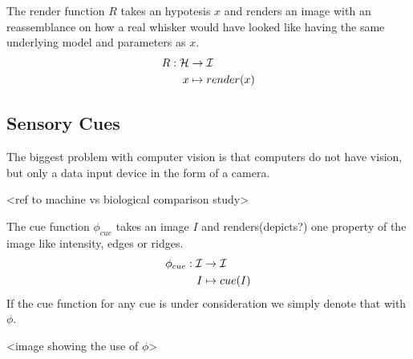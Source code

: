 %
%

%
%

%
%

\begin{definition}
    The render function $R$ takes an hypotesis $x$ and renders an image with an
    reassemblance on how a real whisker would have looked like having the same
    underlying model and parameters as $x$.
    \begin{equation}
        \begin{split}
            R : \mathcal{H} &\rightarrow \mathcal{I}\\
                x &\mapsto render(x)
        \end{split}
    \end{equation}
\end{definition}


\subsection{Sensory Cues}

The biggest problem with computer vision is that computers do not have
vision, but only a data input device in the form of a camera. 

<ref to machine vs biological comparison study>


\begin{definition}
    The cue function $\phi_{cue}$ takes an image $I$ and renders(depicts?) one property of the
    image like intensity, edges or ridges.
    \begin{equation}
        \begin{split}
            \phi_{cue} : \mathcal{I} &\rightarrow \mathcal{I}\\
                I &\mapsto cue(I)
        \end{split}
    \end{equation}
    If the cue function for any cue is under consideration we simply denote that with $\phi$.
\end{definition}


<image showing the use of $\phi$>


